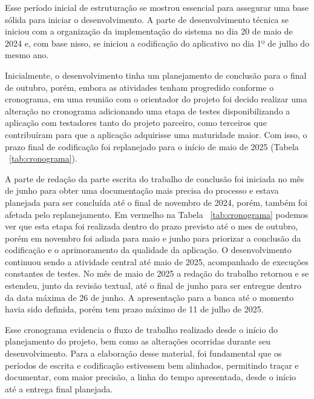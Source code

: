 Esse período inicial de estruturação se mostrou essencial para assegurar uma base 
sólida para iniciar o desenvolvimento. A parte de desenvolvimento técnica se 
iniciou com a organização da implementação do sistema no dia 20 de maio de 2024 
e, com base nisso, se iniciou a codificação do aplicativo no dia 1º de julho do mesmo ano. 

Inicialmente, o desenvolvimento tinha um planejamento de conclusão para o final 
de outubro, porém, embora as atividades tenham progredido conforme o cronograma, 
em uma reunião com o orientador do projeto foi decido realizar uma alteração no 
cronograma adicionando uma etapa de testes disponibilizando a aplicação com 
testadores tanto do projeto parceiro, como terceiros que contribuíram para que 
a aplicação adquirisse uma maturidade maior. Com isso, o prazo final de codificação 
foi replanejado para o início de maio de 2025 (Tabela ~\ref{tab:cronograma}).

A parte de redação da parte escrita do trabalho de conclusão foi iniciada 
no mês de junho para obter uma documentação mais precisa 
do processo e estava planejada para ser concluída até o final de novembro 
de 2024, porém, também foi afetada pelo replanejamento. Em vermelho na 
Tabela ~\ref{tab:cronograma} podemos ver que esta etapa foi realizada dentro 
do prazo previsto até o mes de outubro, porém em novembro foi adiada para maio 
e junho para priorizar a conclusão da codificação e o aprimoramento da qualidade 
da aplicação.
O desenvolvimento continuou sendo a atividade central até maio de 2025, acompanhado 
de execuções constantes de testes. No mês de maio de 2025 a redação do trabalho 
retornou e se estendeu, junto da revisão textual, até o final de junho para ser 
entregue dentro da data máxima de 26 de junho. A apresentação para a banca até o 
momento havia sido definida, porém tem prazo máximo de 11 de julho de 2025.

Esse cronograma evidencia o fluxo de trabalho realizado desde o início do 
planejamento do projeto, bem como as alterações ocorridas durante seu desenvolvimento. 
Para a elaboração desse material, foi fundamental que os períodos de escrita e codificação 
estivessem bem alinhados, permitindo traçar e documentar, com maior precisão, a linha do 
tempo apresentada, desde o início até a entrega final planejada.

